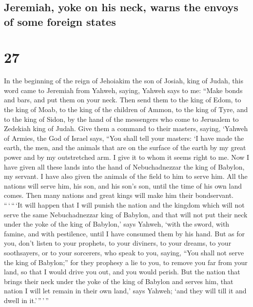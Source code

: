 \hypertarget{jeremiah-yoke-on-his-neck-warns-the-envoys-of-some-foreign-states}{%
\subsection{Jeremiah, yoke on his neck, warns the envoys of some foreign
states}\label{jeremiah-yoke-on-his-neck-warns-the-envoys-of-some-foreign-states}}

\hypertarget{section-26}{%
\section{27}\label{section-26}}

 In the beginning of the reign of Jehoiakim the son of
Josiah, king of Judah, this word came to Jeremiah from Yahweh, saying,
 Yahweh says to me: ``Make bonds and bars, and put them on
your neck.  Then send them to the king of Edom, to the
king of Moab, to the king of the children of Ammon, to the king of Tyre,
and to the king of Sidon, by the hand of the messengers who come to
Jerusalem to Zedekiah king of Judah.  Give them a command
to their masters, saying, `Yahweh of Armies, the God of Israel says,
``You shall tell your masters:  `I have made the earth,
the men, and the animals that are on the surface of the earth by my
great power and by my outstretched arm. I give it to whom it seems right
to me.  Now I have given all these lands into the hand of
Nebuchadnezzar the king of Babylon, my servant. I have also given the
animals of the field to him to serve him.  All the nations
will serve him, his son, and his son's son, until the time of his own
land comes. Then many nations and great kings will make him their
bondservant.  ``\,`\,``\,`It will happen that I will
punish the nation and the kingdom which will not serve the same
Nebuchadnezzar king of Babylon, and that will not put their neck under
the yoke of the king of Babylon,' says Yahweh, `with the sword, with
famine, and with pestilence, until I have consumed them by his hand.
 But as for you, don't listen to your prophets, to your
diviners, to your dreams, to your soothsayers, or to your sorcerers, who
speak to you, saying, ``You shall not serve the king of Babylon;''
 for they prophesy a lie to you, to remove you far from
your land, so that I would drive you out, and you would perish.
 But the nation that brings their neck under the yoke of
the king of Babylon and serves him, that nation I will let remain in
their own land,' says Yahweh; `and they will till it and dwell in
it.'\,''\,'\,''


